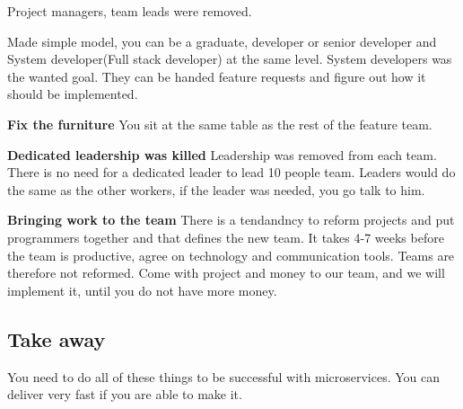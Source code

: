Project managers, team leads were removed. 

Made simple model, you can be a graduate, developer or senior developer and System developer(Full stack developer) at the same level. System developers was the wanted goal. They can be handed feature requests and figure out how it should be implemented.

\textbf{Fix the furniture}
You sit at the same table as the rest of the feature team.

\textbf{Dedicated leadership was killed}
Leadership was removed from each team. There is no need for a dedicated leader to lead 10 people team.
Leaders would do the same as the other workers, if the leader was needed, you go talk to him.

\textbf{Bringing work to the team}
There is a tendandncy to reform projects and put programmers together and that defines the new team.
It takes 4-7 weeks before the team is productive, agree on technology and communication tools. Teams are therefore not reformed.
Come with project and money to our team, and we will implement it, until you do not have more money.

\subsection{Take away}
You need to do all of these things to be successful with microservices. You can deliver very fast if you are able to make it.



